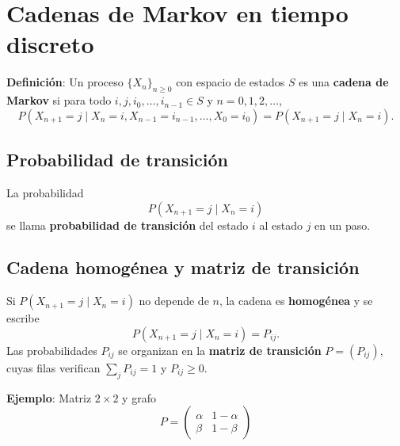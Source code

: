 \documentclass[12pt,a4paper]{article}
\newcommand{\definicion}[1]{%
\begin{definicionbox}
\textbf{Definición}: #1
\end{definicionbox}
}
\begin{document}
\section{Cadenas de Markov en tiempo discreto}
\definicion{Un proceso $\{X_n\}_{n\ge 0}$ con espacio de estados $S$ es una \textbf{cadena de Markov} si para todo
$i,j,i_0,\ldots,i_{n-1}\in S$ y $n=0,1,2,\ldots$,
\begin{equation*}
P(X_{n+1}=j \mid X_n=i, X_{n-1}=i_{n-1},\ldots,X_0=i_0)
= P(X_{n+1}=j \mid X_n=i).
\end{equation*}}

\subsection*{Probabilidad de transición}
La probabilidad
\begin{equation*}
P(X_{n+1}=j \mid X_n=i)
\end{equation*}
se llama \textbf{probabilidad de transición} del estado $i$ al estado $j$ en un paso.

\subsection*{Cadena homogénea y matriz de transición}
Si $P(X_{n+1}=j \mid X_n=i)$ no depende de $n$, la cadena es \textbf{homogénea} y se escribe
\begin{equation*}
P(X_{n+1}=j \mid X_n=i)=P_{ij}.
\end{equation*}
Las probabilidades $P_{ij}$ se organizan en la \textbf{matriz de transición} $P=(P_{ij})$, cuyas filas verifican
$\sum_j P_{ij}=1$ y $P_{ij}\ge 0$.

\textbf{Ejemplo}: Matriz $2\times 2$ y grafo
\begin{equation*}
P=\begin{pmatrix}
\alpha & 1-\alpha\\
\beta & 1-\beta
\end{pmatrix}
\end{equation*}
\begin{center}
\end{center}
\end{document}
